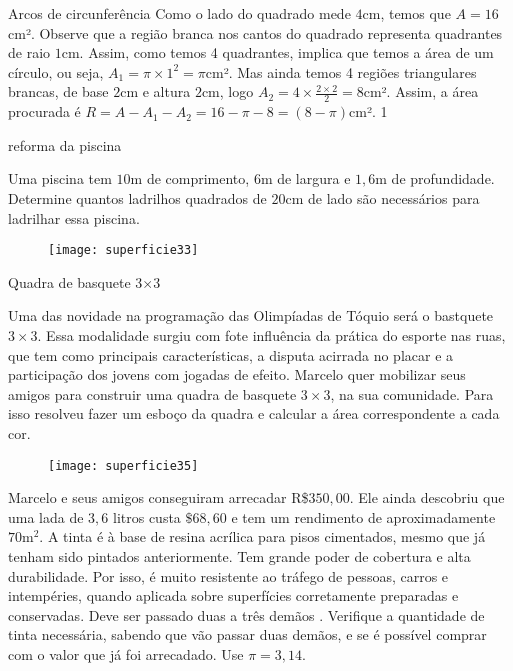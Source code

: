 \begin{answer}{Arcos de circunferência}
{
Como o lado do quadrado mede $4$cm, temos que $A=16$cm². Observe que a região branca nos cantos do quadrado representa quadrantes de raio $1$cm. Assim, como temos 4 quadrantes, implica que temos a área de um círculo, ou seja, $A_1=\pi\times1^2=\pi$cm². Mas ainda temos 4 regiões triangulares brancas, de base $2$cm e altura $2$cm, logo $A_2=4\times\frac{2\times2}{2}=8$cm². Assim, a área procurada é $R=A-A_1-A_2=16-\pi-8=(8-\pi)$cm².
}{1}
\end{answer}


\begin{task}{reforma da piscina}

Uma piscina tem $10$m de comprimento, $6$m de largura e $1{,}6$m de profundidade. Determine quantos ladrilhos quadrados de $20$cm de lado são necessários para ladrilhar essa piscina.

\begin{figure}[H]
\centering

\texttt{[image: superficie33]}

\end{figure}
\end{task}

\begin{task}{Quadra de basquete 3$\bm{\times}$3}

Uma das novidade na programação das Olimpíadas de Tóquio será o bastquete $3\times3$. Essa modalidade surgiu com fote influência da prática do esporte nas ruas, que tem como principais características, a disputa acirrada no placar e a participação dos jovens com jogadas de efeito. Marcelo quer mobilizar seus amigos para construir uma quadra de basquete $3\times3$, na sua comunidade. Para isso resolveu fazer um esboço da quadra e calcular a área correspondente a cada cor.

\begin{figure}[H]
\centering

\texttt{[image: superficie35]}

\end{figure}

Marcelo e seus amigos conseguiram arrecadar R\$$350{,}00$. Ele ainda descobriu que uma lada de $3{,}6$ litros custa $\$68{,}60$ e tem um rendimento de aproximadamente $70$m$^2$. A tinta é à base de resina acrílica para pisos cimentados, mesmo que já tenham sido pintados anteriormente. Tem grande poder de cobertura e alta durabilidade. Por isso, é muito resistente ao tráfego de pessoas, carros e intempéries, quando aplicada sobre superfícies corretamente preparadas e conservadas. Deve ser passado duas a três demãos %
. Verifique a quantidade de tinta necessária, sabendo que vão passar duas demãos, e se é possível comprar com o valor que já foi arrecadado. Use $\pi=3{,}14$.
\end{task}

